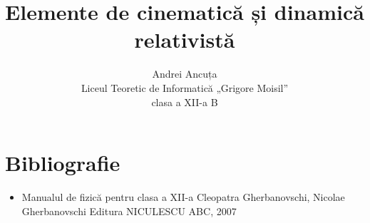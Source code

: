 \documentclass[a4paper, 12pt]{article}
\title{Elemente de cinematică și dinamică relativistă}
\author{Andrei Ancuța \\ Liceul Teoretic de Informatică „Grigore Moisil” \\
clasa a XII-a B}
\date{}
\def\\{}%
\begin{document}
\maketitle
\tableofcontents




\clearpage


\clearpage

\section*{Bibliografie}
\begin{itemize}
    \item Manualul de fizică pentru clasa a XII-a \\
        Cleopatra Gherbanovschi, Nicolae Gherbanovschi \\
        Editura NICULESCU ABC, 2007
\end{itemize}
\end{document}
